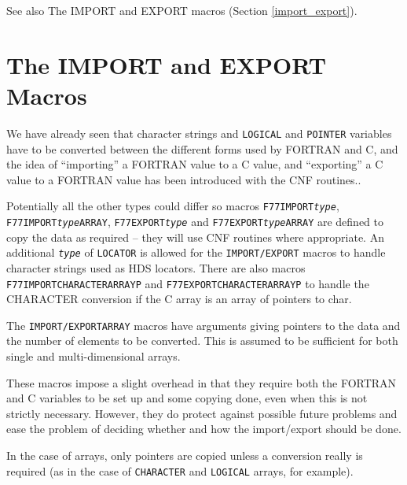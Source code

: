 \documentclass[twoside,11pt]{article}
\newcommand{\htmlref}[2]{#1}
\newcommand{\latex}[1]{#1}
\newcommand{\xlabel}[1]{}
\renewcommand{\_}{\texttt{\symbol{95}}}
\begin{document}
See also
\htmlref{The IMPORT and EXPORT macros}{import_export}\latex{ (Section
\ref{import_export})}.

\section{\xlabel{the_import_and_export_macros}\label{import_export}The IMPORT and EXPORT Macros}
We have already seen that character strings and \texttt{LOGICAL} and
\texttt{POINTER} variables
have to be converted between the different forms used by FORTRAN and C, and 
the idea of ``importing'' a FORTRAN value to a C value, and ``exporting'' a C 
value to a FORTRAN value has been introduced with the CNF routines.. 

Potentially all the other types could differ so macros
\htmlref{\texttt{F77\_\-IMPORT\_\-\textit{type}}}{F77_IMPORT_type},
\htmlref{\texttt{F77\_\-IMPORT\_\-\textit{type}\_\-ARRAY}}
{F77_IMPORT_type_ARRAY},
\htmlref{\texttt{F77\_\-EXPORT\_\-\textit{type}}}{F77_EXPORT_type}
and
\htmlref{\texttt{F77\_\-EXPORT\_\-\textit{type}\_\-ARRAY}}
{F77_EXPORT_type_ARRAY}
are defined to copy the data as required -- they will use CNF routines 
where appropriate. An additional \texttt{\textit{type}} of \texttt{LOCATOR}
is allowed for the \texttt{IMPORT/EXPORT} macros to handle character strings 
used as 
\htmlref{HDS locators}{locators}.
There are also macros
\htmlref{\texttt{F77\_\-IMPORT\_\-CHARACTER\_\-ARRAY\_P}}
        {F77_IMPORT_CHARACTER_ARRAY_P}
and
\htmlref{\texttt{F77\_\-EXPORT\_\-CHARACTER\_\-ARRAY\_P}}
        {F77_EXPORT_CHARACTER_ARRAY_P}
to handle the CHARACTER conversion if the C array is an 
\htmlref{array of pointers to char}{char_ptrs}.

The \texttt{IMPORT/EXPORT\_ARRAY} macros have arguments giving pointers to 
the data and the number of elements to be converted. This is assumed to be
sufficient for both single and multi-dimensional arrays. 

These macros impose a slight overhead in that they require both the FORTRAN and
C variables to be set up and some copying done, even when this is not strictly
necessary. 
However, they do protect against possible future problems and ease the
problem of deciding whether and how the import/export should be done.

In the case of arrays, only pointers are copied unless a conversion really is
required (as in the case of \texttt{CHARACTER} and \texttt{LOGICAL} arrays, for
example).
\end{document}
